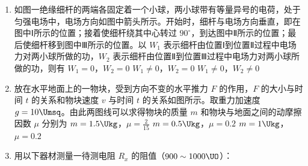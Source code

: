 \documentclass[\gkver]{gaokaozhenti}
\begin{document}
\begin{enumerate}

\item
如图一绝缘细杆的两端各固定着一个小球，两小球带有等量异号的电荷，处于匀强电场中，电场方向如图中箭头所示。开始时，细杆与电场方向垂直，即在图中Ⅰ所示的位置；接着使细杆绕其中心转过 $90^{\circ}$，到达图中Ⅱ所示的位置；最后使细杆移到图中Ⅲ所示的位置。以 $W_{1}$ 表示细杆由位置Ⅰ到位置Ⅱ过程中电场力对两小球所做的功，$W_{2}$ 表示细杆由位置Ⅱ到位置Ⅲ过程中电场力对两小球所做的功，则有
\onepicture[w=4.10cm]{}
{$W_{1}=0$，$W_{2}=0$}
{$W_{1}\neq0$，$W_{2}=0$}
{$W_{1}\neq0$，$W_{2}\neq0$}


\item
放在水平地面上的一物块，受到方向不变的水平推力 $F$ 的作用，$F$ 的大小与时间 $t$ 的关系和物块速度 $v$ 与时间 $t$ 的关系如图所示。取重力加速度 $g=10\Umsq$。由此两图线可以求得物块的质量 $m$ 和物块与地面之间的动摩擦因数 $\mu$ 分别为
{$m=1.5\Ukg$，$\mu=\frac{2}{15}$}
{$m=0.5\Ukg$，$\mu=0.2$}
{$m=1\Ukg$，$\mu=0.2$}


\item
用以下器材测量一待测电阻 $R_{x}$ 的阻值（$900\sim1000\UO$）：


\end{enumerate}
\end{document}
